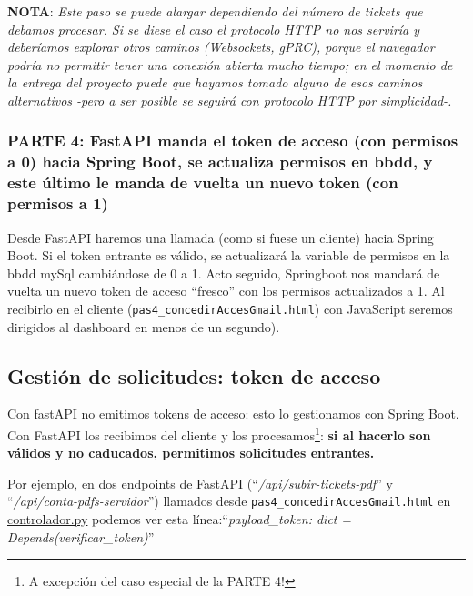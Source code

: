 \documentclass[a4paper,12pt]{report}
\begin{document}
		\textbf{NOTA}: \textit{Este paso se puede alargar dependiendo del número de tickets que debamos procesar. Si se diese el caso el protocolo HTTP no nos serviría y deberíamos explorar otros caminos (Websockets, gPRC), porque el navegador podría no permitir tener una conexión abierta mucho tiempo; en el momento de la entrega del proyecto puede que hayamos tomado alguno de esos caminos alternativos -pero a ser posible se seguirá con protocolo HTTP por simplicidad-.}
		
		
		
		
		
		
		
		
		
		
		\subsubsection{PARTE 4: FastAPI manda el token de acceso (con permisos a 0) hacia Spring Boot, se actualiza permisos en bbdd, y este último le manda de vuelta un nuevo token (con permisos a 1)}
		\label{sec:PARTE4_FASTAPI}
		
		Desde FastAPI haremos una llamada (como si fuese un cliente) hacia Spring Boot. Si el token entrante es válido, se actualizará la variable de permisos en la bbdd mySql cambiándose de 0 a 1. Acto seguido, Springboot nos mandará de vuelta un nuevo token de acceso ``fresco'' con los permisos actualizados a 1. Al recibirlo en el cliente (\texttt{pas4\_concedirAccesGmail.html}) con JavaScript seremos dirigidos al dashboard en menos de un segundo).
		
		
	
	
	\subsection{Gestión de solicitudes: token de acceso}
	
	Con fastAPI no emitimos tokens de acceso: esto lo gestionamos con Spring Boot. Con FastAPI los recibimos del cliente y los procesamos\footnote{A excepción del caso especial de la PARTE 4!}: \textbf{si al hacerlo son válidos y no caducados, permitimos solicitudes entrantes.}
	
	Por ejemplo, en dos endpoints de FastAPI (``\textit{/api/subir-tickets-pdf}'' y ``\textit{/api/conta-pdfs-servidor}'') llamados desde \texttt{pas4\_concedirAccesGmail.html} en \href{https://github.com/blackcub3s/mercApp/blob/main/APP%20WEB/__FastAPI__/app/controlador.py}{controlador.py}  podemos ver esta línea:``\textit{payload\_token: dict = Depends(verificar\_token)}''
	 
\end{document}
